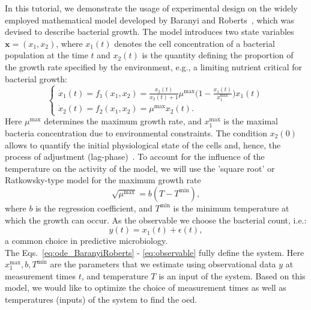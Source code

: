 \documentclass[graybox]{svmult}
\newcommand{\mbx}{\mathbf{x}}
\begin{document}
In this tutorial, we demonstrate the usage of experimental design on the widely employed mathematical model developed by Baranyi and Roberts~\cite{baranyiDynamicApproach1994}, which was devised to describe bacterial growth.
The model introduces two state variables $\mbx = (x_1, x_2)$, where $x_1(t)$ denotes the cell concentration of a bacterial population at the time $t$
and $x_2(t)$ is the quantity defining the proportion of the growth rate specified by the environment, e.g., a limiting nutrient critical for bacterial growth:
\begin{equation}
    \begin{cases}
        \dot x_1(t) = f_1(x_1, x_2) = \frac{x_2(t)}{x_2(t) + 1} \mu^\text{max} \big(1 - \frac{x_1(t)}{x_1^\text{max}}\big) x_1(t)\\
        \dot x_2(t) = f_2(x_1, x_2) = \mu^\text{max}  x_2(t).
        \label{eq:ode_BaranyiRoberts}
    \end{cases}
\end{equation}
Here $\mu^\text{max}$ determines the maximum growth rate, and $x_1^\text{max}$ is the maximal bacteria concentration due to environmental constraints.
The condition $x_2(0)$ allows to quantify the initial physiological state of the cells and, hence, the process of adjustment (lag-phase)~\cite{grijspeerdt_estimating_1999}.
To account for the influence of the temperature on the activity of the model, we will use the 'square root' or Ratkowsky-type model for the maximum growth rate~\cite{ratkowsky_relationship_1982}
\begin{equation}
    \sqrt{\mu^\text{max}} = b (T - T^\text{min}),
    \label{eq:RatkowskyModel}
\end{equation}
where $b$ is the regression coefficient, and $T^\text{min}$ is the minimum temperature at which the growth can occur.
As the observable we choose the bacterial count, i.e.:
\begin{equation}
    y(t) = x_1(t)+\epsilon(t),
    \label{eq:observable}
 \end{equation}
a common choice in predictive microbiology.\\
The Eqs.~\ref{eq:ode_BaranyiRoberts} - \ref{eq:observable} fully define the system.
Here $x_1^\text{max}, b, T^\text{min}$ are the parameters that we estimate using observational data $y$ at measurement times $t$, and temperature $T$ is an input of the system.
Based on this model, we would like to optimize the choice of measurement times as well as temperatures (inputs) of the system to find the \acl{oed}.
%
\end{document}

